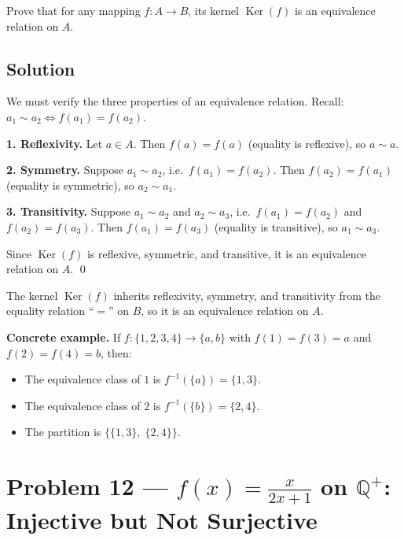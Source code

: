 \documentclass[12pt, a4paper]{article}
\newcommand{\Q}{\mathbb{Q}}
\begin{document}
\begin{problembox}
Prove that for any mapping $f : A \to B$, its kernel $\operatorname{Ker}(f)$ is an equivalence relation on $A$.
\end{problembox}

\subsection*{Solution}

We must verify the three properties of an equivalence relation.
Recall: $a_1 \sim a_2 \iff f(a_1) = f(a_2)$.

\textbf{1. Reflexivity.}\;
Let $a \in A$. Then $f(a) = f(a)$ (equality is reflexive), so $a \sim a$. \checkmark

\textbf{2. Symmetry.}\;
Suppose $a_1 \sim a_2$, i.e.\ $f(a_1) = f(a_2)$.
Then $f(a_2) = f(a_1)$ (equality is symmetric), so $a_2 \sim a_1$. \checkmark

\textbf{3. Transitivity.}\;
Suppose $a_1 \sim a_2$ and $a_2 \sim a_3$, i.e.\ $f(a_1) = f(a_2)$ and $f(a_2) = f(a_3)$.
Then $f(a_1) = f(a_3)$ (equality is transitive), so $a_1 \sim a_3$. \checkmark

\medskip
Since $\operatorname{Ker}(f)$ is reflexive, symmetric, and transitive, it is an equivalence relation on $A$. \qed

\begin{answerbox}
The kernel $\operatorname{Ker}(f)$ inherits reflexivity, symmetry, and transitivity
from the equality relation ``$=$'' on $B$, so it is an equivalence relation on $A$.
\end{answerbox}

\bigskip
\textbf{Concrete example.}\; If $f \colon \{1,2,3,4\} \to \{a,b\}$ with $f(1) = f(3) = a$ and $f(2) = f(4) = b$, then:
\begin{itemize}[nosep]
  \item The equivalence class of $1$ is $f^{-1}(\{a\}) = \{1, 3\}$.
  \item The equivalence class of $2$ is $f^{-1}(\{b\}) = \{2, 4\}$.
  \item The partition is $\bigl\{\{1,3\},\;\{2,4\}\bigr\}$.
\end{itemize}

\newpage
\section{Problem 12 --- \texorpdfstring{$f(x) = \frac{x}{2x+1}$}{f(x)=x/(2x+1)} on \texorpdfstring{$\Q^+$}{Q+}: Injective but Not Surjective}
\end{document}
